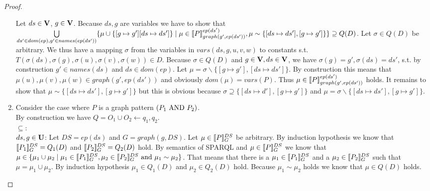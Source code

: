 \begin{proof}
\begin{enumerate}
			\bigskip\noindent
			Let $ds \in \mathbf{V}$, $g \in \mathbf{V}$.
			Because $ds,g$ are variables we have to show that \\
			$\bigcup\limits_{ds' \in dom(ep),g' \in names(ep(ds'))} 
			\{ \mu \cup \{[g\mapsto g'][ds \mapsto ds'] \} \\ 
				\mid \mu \in \llbracket P
			\rrbracket^{ep(ds')}_{graph(g',ep(ds'))},
			\mu \sim \{[ds \mapsto ds'], [g \mapsto g']\}\} \supseteq Q(D)$.
			Let $\sigma \in Q(D)$ be arbitrary.
			We thus have a mapping $\sigma$ from the variables in $vars(ds,g,u,v,w)$ to constants s.t.
			$T(\sigma(ds),\sigma(g),\sigma(u),\sigma(v),\sigma(w)) \in D$.
			Because $\sigma \in Q(D)$ and $g \in \mathbf{V}, ds \in \mathbf{V}$, we have
			$\sigma(g) = g', \sigma(ds) = ds'$, s.t. by construction $g' \in
			names(ds)$ and $ds \in dom(ep)$. Let $\mu =
			\sigma\backslash\{[g\mapsto g'],
			[ds\mapsto ds']\}$. By construction
			this means that 	$\mu(u),\mu(v),\mu(w) \in graph(g',ep(ds'))$ 
			and obviously $dom(\mu) = vars(P)$. Thus $\mu \in \llbracket P
			\rrbracket^{ep(ds')}_{graph(g',ep(ds'))}$ holds. It remains to show that $\mu \sim \{[ds \mapsto
			ds'],[g \mapsto g']\}$
			but this is obvious because $\sigma \supseteq \{[ds \mapsto d'],[g \mapsto
			g']\}$  and $\mu = \sigma \backslash \{[ds \mapsto ds'],[g \mapsto
			g']\}$.


		\item Consider the case where $P$ is a graph pattern $(P_1 \mbox{ AND } P_2)$. \\
			By construction we have $Q = O_1 \cup O_2 \leftarrow q_1, q_2$. \\
			$\subseteq:$\\
			$ds,g \in \mathbf{U}$: Let $DS = ep(ds)$ and $G = graph(g,DS)$.
			Let $\mu \in \llbracket P \rrbracket^{DS}_{G}$ be arbitrary. 
			By induction hypothesis we know that
			$\llbracket P_1 \rrbracket^{DS}_{G} = Q_1(D)$  and
			$\llbracket P_2 \rrbracket^{DS}_{G} = Q_2(D)$ hold.
			By semantics of SPARQL and $\mu \in \llbracket P \rrbracket^{DS}_{G}$ we know that 
			$\mu \in \{\mu_1 \cup \mu_2 \mid \mu_1 \in \llbracket P_1 \rrbracket^{DS}_{G}, \mu_2 \in \llbracket
			P_2 \rrbracket^{DS}_{G} \mbox{ and }  \mu_1 \sim \mu_2\}$. 
			That means that there is a $\mu_1 \in \llbracket P_1 \rrbracket_{G}^{DS}$ 
			and a $\mu_2 \in \llbracket P_2 \rrbracket^{DS}_{G}$ such that $\mu = \mu_1 \cup \mu_2$.
			By induction hypothesis $\mu_1 \in Q_1(D)$ and $\mu_2 \in Q_2(D)$ hold.
			Because $\mu_1 \sim \mu_2$ holds we know that $\mu \in Q(D)$ holds. 


\end{enumerate}
\end{proof}
